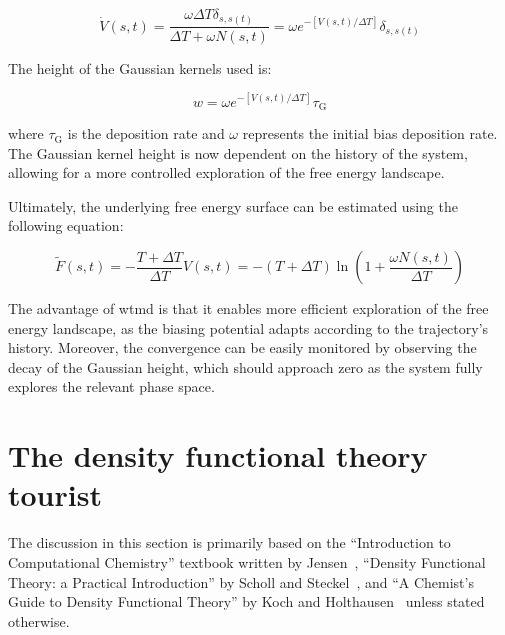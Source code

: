 \begin{equation}
    \dot{V}(s,t) = \frac{\omega \Delta T \delta_{s,s(t)}}{\Delta T + \omega N(s,t)} 
    = \omega e^{-[V(s,t)/\Delta T]} \delta_{s,s(t)}
    \label{eq:hill_deposition_rate}
\end{equation}

The height of the Gaussian kernels used is:

\begin{equation}
    w = \omega e^{-[V(s,t)/\Delta T]} \tau_{\text{G}}
    \label{eq:hill_height}
\end{equation}

where $\tau_{\text{G}}$ is the deposition rate and $\omega$ represents the initial bias deposition rate. The Gaussian kernel height is now dependent on the history of the system, allowing for a more controlled exploration of the free energy landscape.

Ultimately, the underlying free energy surface can be estimated using the following equation:

\begin{equation}
    \tilde{F}(s,t) = -\frac{T + \Delta T}{\Delta T} V(s,t) 
    = -(T + \Delta T) \ln\left(1 + \frac{\omega N(s,t)}{\Delta T} \right)
    \label{eq:free_energy_surface_reconstruction}
\end{equation}

The advantage of \ac{wtmd} is that it enables more efficient exploration of the free energy landscape, as the biasing potential adapts according to the trajectory's history. Moreover, the convergence can be easily monitored by observing the decay of the Gaussian height, which should approach zero as the system fully explores the relevant phase space.








\section{The density functional theory tourist}
The discussion in this section is primarily based on the ``Introduction to Computational Chemistry'' textbook written by Jensen~\citep{jensenIntroductionComputationalChemistry2017}, ``Density Functional Theory: a Practical Introduction'' by Scholl and Steckel~\citep{shollDensityFunctionalTheory2011}, and ``A Chemist's Guide to Density Functional Theory'' by Koch and Holthausen~\citep{kochChemistsGuideDensity2015} unless stated otherwise.


